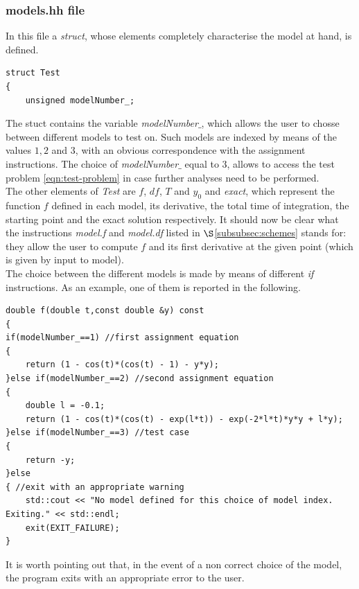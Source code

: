 \documentclass[11pt]{article}
\theoremstyle{theorem}
\theoremstyle{definition}
\begin{document}
\subsubsection{models.hh file}
\label{subsubsec:models}
In this file a \emph{struct}, whose elements completely characterise the model at hand, is defined.

\begin{lstlisting}
struct Test
{
	unsigned modelNumber_;
\end{lstlisting}

The stuct contains the variable \emph{modelNumber$\_$}, which allows the user to chosse between different models to test on. Such models are indexed by means of the values $1, 2$ and $3$, with an obvious correspondence with the assignment instructions. The choice of \emph{modelNumber$\_$} equal to 3, allows to access the test problem \eqref{eqn:test-problem} in case further analyses need to be performed.\\
The other elements of \emph{Test} are $f$, $df$, $T$ and $y_0$ and \emph{exact}, which represent the function $f$ defined in each model, its derivative, the total time of integration, the starting point and the exact solution respectively. It should now be clear what the instructions \emph{model.f} and \emph{model.df} listed in $\S$\ref{subsubsec:schemes} stands for: they allow the user to compute $f$ and its first derivative at the given point (which is given by input to model).\\
The choice between the different models is made by means of different \emph{if} instructions. As an example, one of them is reported in the following.\\

\begin{lstlisting}
double f(double t,const double &y) const
{
if(modelNumber_==1) //first assignment equation
{
	return (1 - cos(t)*(cos(t) - 1) - y*y);
}else if(modelNumber_==2) //second assignment equation
{
	double l = -0.1;
	return (1 - cos(t)*(cos(t) - exp(l*t)) - exp(-2*l*t)*y*y + l*y);
}else if(modelNumber_==3) //test case
{
	return -y;
}else
{ //exit with an appropriate warning
	std::cout << "No model defined for this choice of model index. Exiting." << std::endl;
	exit(EXIT_FAILURE);
}
\end{lstlisting}

It is worth pointing out that, in the event of a non correct choice of the model, the program exits with an appropriate error to the user.\\
\end{document}
